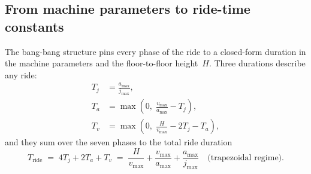 \documentclass[manuscript,review,screen]{acmart}
\begin{document}
\subsection{From machine parameters to ride-time constants}
\label{sec:bg-time-constants}

The bang-bang structure pins every phase of the ride to a
closed-form duration in the machine parameters and the
floor-to-floor height~$H$.  Three durations describe any ride:
\begin{align}
  T_j &= \frac{a_{\max}}{j_{\max}}, \label{eq:Tj}\\
  T_a &= \max\!\left(0,\;\frac{v_{\max}}{a_{\max}}-T_j\right),
         \label{eq:Ta}\\
  T_v &= \max\!\left(0,\;\frac{H}{v_{\max}}-2T_j-T_a\right),
         \label{eq:Tv}
\end{align}
and they sum over the seven phases to the total ride duration
\begin{equation}
  T_{\text{ride}} \;=\; 4T_j + 2T_a + T_v
  \;=\; \frac{H}{v_{\max}} + \frac{v_{\max}}{a_{\max}}
        + \frac{a_{\max}}{j_{\max}}
  \quad\text{(trapezoidal regime).}
  \label{eq:elevator-durations}
\end{equation}
\end{document}
